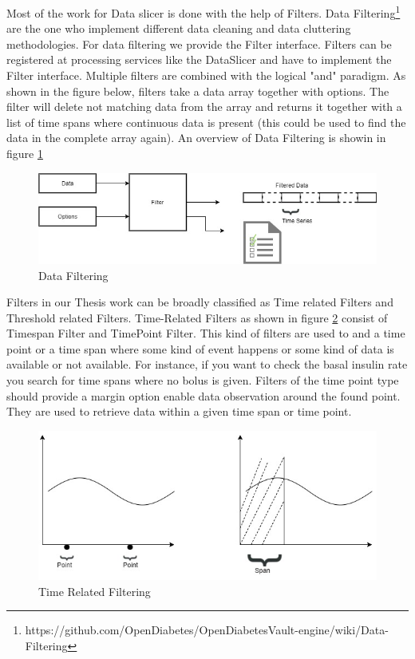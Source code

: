 \documentclass[article,type=msc,colorback,accentcolor=tud9c,twoside,11pt]{tudthesis}
\begin{document}
Most of the work for Data slicer is done with the help of Filters. Data Filtering\footnote{https://github.com/OpenDiabetes/OpenDiabetesVault-engine/wiki/Data-Filtering} are the one who implement different data cleaning and data cluttering methodologies. For data filtering we provide the Filter interface. Filters can be registered at processing services like the DataSlicer and have to implement the Filter interface. Multiple filters are combined with the logical "and" paradigm. As shown in the figure below, filters take a data array together with options. The filter will delete not matching data from the array and returns it together with a list of time spans where continuous data is present (this could be used to find the data in the complete array again).  An overview of Data Filtering is showin in figure \ref{fig:Filters} 
\begin{figure}[h]
	\centering
	\includegraphics[scale=0.7]{Filters.jpg}
	\caption{Data Filtering}
	\label{fig:Filters}
\end{figure}
Filters in our Thesis work can be broadly classified as Time related Filters and
Threshold related Filters. Time-Related Filters as shown in figure \ref{fig:TimeRelated} consist of Timespan Filter and TimePoint Filter. This kind of filters are used to and a time point or a time span where some kind of event happens or some kind of data is available or not available.
For instance, if you want to check the basal insulin rate you search for time spans where no bolus is given. Filters of the time point type should provide a margin option enable data observation around the found point. They are used to retrieve data within a given time span or time point.
\begin{figure}[h]
	\centering
	\includegraphics[scale=0.7]{TimeRelated.jpg}
	\caption{Time Related Filtering}
	\label{fig:TimeRelated}
\end{figure}
\end{document}
